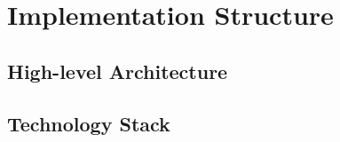 \chapter{Implementation Structure}\label{ch:thesis_implementation}
\section*{High-level Architecture}

\section*{Technology Stack}

\section*{}
